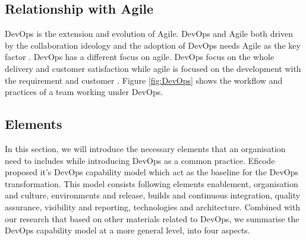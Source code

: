 \subsection{Relationship with Agile}
DevOps is the extension and evolution \cite{lwakatare2016relationship}\cite{leite2019survey} of Agile. DevOps and Agile both driven by the collaboration ideology and the adoption of DevOps needs Agile as the key factor \cite{lwakatare2016relationship}. DevOps has a different focus on agile. DevOps focus on the whole delivery and customer satisfaction while agile is focused on the development with the requirement and customer \cite{buchanan2015agile}. Figure \ref{fig:DevOps} shows the workflow and practices of a team working under DevOps.
\subsection{Elements}
In this section, we will introduce the necessary elements that an organisation need to includes while introducing DevOps as a common practice.
Eficode proposed it's DevOps capability model which act as the baseline for the DevOps transformation. This model consists following elements enablement, organisation and culture, environments and release, builds and continuous integration,  quality assurance, visibility and reporting, technologies and architecture. Combined with our research that based on other materials related to DevOps, we summarise the DevOps capability model at a more general level, into four aspects.
